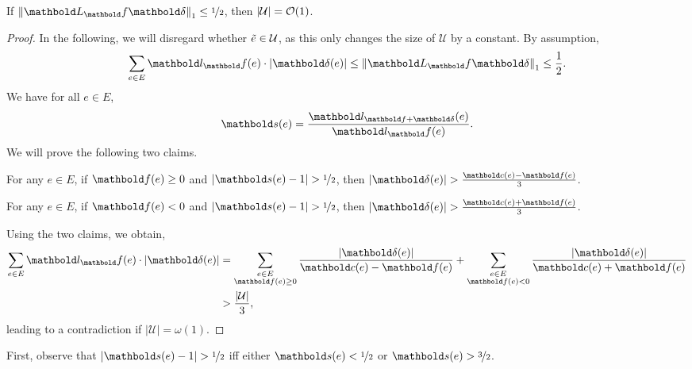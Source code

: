 \documentclass{tufte-handout}
\newcommand{\etil}{\Tilde{e}}
\begin{document}
\begin{lem}
If $\norm{\mL_\vf \vdelta}_1 \leq \nicefrac{1}{2}$, then $|\mathcal{U}| = \LandauO{1}$.
\end{lem}
\begin{proof}
In the following, we will disregard whether $\etil \in \mathcal{U}$, as this only changes the size of $\mathcal{U}$ by a constant. By assumption, \begin{align*}
    \sum_{e \in E} \vl_\vf(e) \cdot |\vdelta(e)| \leq \norm{\mL_\vf\vdelta}_1 \leq \frac{1}{2}.
\end{align*} We have for all $e \in E$, \begin{align*}
    \vs(e) = \frac{\vl_{\vf + \vdelta}(e)}{\vl_\vf(e)}.
\end{align*} We will prove the following two claims.

\begin{clm}\label{clm:2:D:1:1}
For any $e \in E$, if $\vf(e) \geq 0$ and $|\vs(e) - 1| > \nicefrac{1}{2}$, then $|\vdelta(e)| > \frac{\vc(e) - \vf(e)}{3}$.
\end{clm}
\begin{clm}\label{clm:2:D:1:2}
For any $e \in E$, if $\vf(e) < 0$ and $|\vs(e) - 1| > \nicefrac{1}{2}$, then $|\vdelta(e)| > \frac{\vc(e) + \vf(e)}{3}$.
\end{clm}

Using the two claims, we obtain, \begin{align*}
    \sum_{e \in E} \vl_\vf(e) \cdot |\vdelta(e)| &= \sum_{\substack{e \in E \\ \vf(e) \geq 0}} \frac{|\vdelta(e)|}{\vc(e) - \vf(e)} + \sum_{\substack{e \in E \\ \vf(e) < 0}} \frac{|\vdelta(e)|}{\vc(e) + \vf(e)} \\
    &> \frac{|\mathcal{U}|}{3},
\end{align*} leading to a contradiction if $|\mathcal{U}| = \omega(1)$.
\end{proof}

First, observe that $|\vs(e) - 1| > \nicefrac{1}{2}$ iff either $\vs(e) < \nicefrac{1}{2}$ or $\vs(e) > \nicefrac{3}{2}$.
\end{document}
